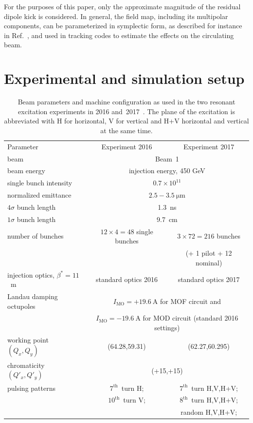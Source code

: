 \documentclass[%
 reprint,
 amsmath,amssymb,
 aps,
prstab,
longbibliography,
]{revtex4-1}
\begin{document}
For the purposes of this paper, only the approximate magnitude of the
residual dipole kick is considered. In general, the field map,
including its multipolar components, can be parameterized in
symplectic form, as described for instance in
Ref.~\cite{hel_bends_stancari}, and used in tracking codes to estimate
the effects on the circulating beam.



\section{Experimental and simulation setup\label{sec:exp}}

\begin{table}
	\caption{\label{tab:md_param}%
		Beam parameters and machine configuration as used in the two resonant excitation experiments in 2016 and~2017~\cite{resexmd2016,resexmd2017}. The plane of the excitation is abbreviated with H for horizontal, V for vertical and H+V horizontal and vertical at the same time.
	}
	\begin{ruledtabular}
		\begin{tabular}{lcc}
			Parameter & Experiment 2016 & Experiment 2017  \\
			\colrule
			beam &\multicolumn{2}{c}{Beam~1} \\
			beam energy &\multicolumn{2}{c}{injection energy, 450 GeV} \\\hline
			single bunch intensity &\multicolumn{2}{c}{$0.7\times10^{11}$} \\
			normalized emittance &\multicolumn{2}{c}{$2.5-3.5~\mathrm{\mu m}$} \\
			$4\sigma$ bunch length & \multicolumn{2}{c}{1.3~ns}\\
			$1\sigma$ bunch length & \multicolumn{2}{c}{9.7~cm}\\
			number of bunches & $12\times4=48$ single bunches & $3\times72=216$ bunches\\
			&  & (+ 1 pilot + 12 nominal) \\\hline
			injection optics, $\beta^*=11$~m & standard optics 2016 & standard optics 2017\\
			Landau damping octupoles  & \multicolumn{2}{c}{$I_{\mathrm{MO}}=+19.6~\mathrm{A}$ for MOF circuit and}\\
			& \multicolumn{2}{c}{$I_{\mathrm{MO}}=-19.6~\mathrm{A}$ for MOD circuit (standard 2016 settings)}\\\hline
			working point $(Q_x,Q_y)$ & (64.28,59.31) & (62.27,60.295) \\
			chromaticity $(Q'_x,Q'_y)$ & \multicolumn{2}{c}{(+15,+15)}\\\hline
			pulsing patterns  &$7^{\mathrm{th}}$~turn H; &$7^{\mathrm{th}}$~turn H,V,H+V; \\
			& $10^{\mathrm{th}}$~turn V; & $8^{\mathrm{th}}$~turn H,V,H+V; \\
			& &  random  H,V,H+V;\\
		\end{tabular}
	\end{ruledtabular}
\end{table}
\end{document}
